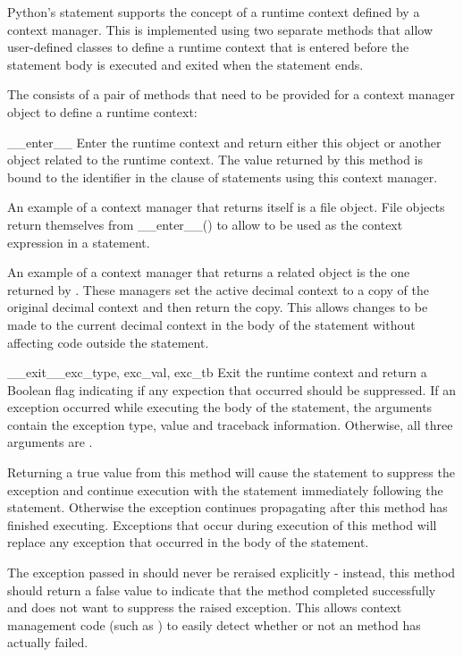 
Python's  statement supports the concept of a runtime
context defined by a context manager.  This is implemented using
two separate methods that allow user-defined classes to define
a runtime context that is entered before the statement body is
executed and exited when the statement ends.

The  consists of a pair of
methods that need to be provided for a context manager object to
define a runtime context:

\begin{methoddesc}{__enter__}{}
  Enter the runtime context and return either this object or another
  object related to the runtime context. The value returned by this
  method is bound to the identifier in the  clause of
   statements using this context manager.

  An example of a context manager that returns itself is a file object.
  File objects return themselves from __enter__() to allow
   to be used as the context expression in a
   statement.

  An example of a context manager that returns a related
  object is the one returned by .
  These managers set the active decimal context to a copy of the
  original decimal context and then return the copy. This allows
  changes to be made to the current decimal context in the body of
  the  statement without affecting code outside
  the  statement.
\end{methoddesc}

\begin{methoddesc}{__exit__}{exc_type, exc_val, exc_tb}
  Exit the runtime context and return a Boolean flag indicating if any
  expection that occurred should be suppressed. If an exception
  occurred while executing the body of the  statement, the
  arguments contain the exception type, value and traceback information.
  Otherwise, all three arguments are .

  Returning a true value from this method will cause the 
  statement to suppress the exception and continue execution with the
  statement immediately following the  statement. Otherwise
  the exception continues propagating after this method has finished
  executing. Exceptions that occur during execution of this method will
  replace any exception that occurred in the body of the 
  statement.

  The exception passed in should never be reraised explicitly - instead,
  this method should return a false value to indicate that the method
  completed successfully and does not want to suppress the raised
  exception. This allows context management code (such as
  ) to easily detect whether or not an
   method has actually failed.
\end{methoddesc}

